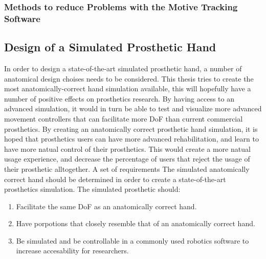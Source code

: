\documentclass[../main.tex]{subfiles}
\begin{document}


\subsubsection{Methods to reduce Problems with the Motive Tracking Software}





\subsection{Design of a Simulated Prosthetic Hand}
\label{sec:prost_sim}

In order to design a state-of-the-art simulated prosthetic hand, a number of anatomical design choises needs to be considered.
This thesis tries to create the most anatomically-correct hand simulation available, this will hopefully have a number of positive effects on prosthetics research.
By having access to an advanced simulation, it would in turn be able to test and visualize more advanced movement controllers that can facilitate more DoF than current commercial prosthetics. 
By creating an anatomically correct prosthetic hand simulation, it is hoped that prosthetics users can have more advanced rehabilitation, and learn to have more natual control of their prosthetics. This would create a more natual usage experience, and decrease the percentage of users that reject the usage of their prosthetic alltogether.
A set of requirements The simulated anatomically correct hand should be determined in order to create a state-of-the-art prosthetics simulation.
The simulated prosthetic should:

\begin{enumerate}
\item Facilitate the same DoF as an anatomically correct hand.
\item Have porpotions that closely resemble that of an anatomically correct hand.
\item Be simulated and be controllable in a commonly used robotics software to increase accesability for researchers.
\end{enumerate}
\end{document}
